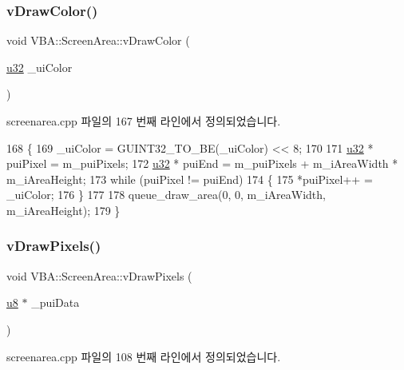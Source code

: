 \subsubsection{\texorpdfstring{v\+Draw\+Color()}{vDrawColor()}}
{\footnotesize\ttfamily void V\+B\+A\+::\+Screen\+Area\+::v\+Draw\+Color (\begin{DoxyParamCaption}\item[{\mbox{\hyperlink{_system_8h_a10e94b422ef0c20dcdec20d31a1f5049}{u32}}}]{\+\_\+ui\+Color }\end{DoxyParamCaption})}



screenarea.\+cpp 파일의 167 번째 라인에서 정의되었습니다.


\begin{DoxyCode}
168 \{
169   \_uiColor = GUINT32\_TO\_BE(\_uiColor) << 8;
170 
171   \mbox{\hyperlink{_system_8h_a10e94b422ef0c20dcdec20d31a1f5049}{u32}} * puiPixel = m\_puiPixels;
172   \mbox{\hyperlink{_system_8h_a10e94b422ef0c20dcdec20d31a1f5049}{u32}} * puiEnd   = m\_puiPixels + m\_iAreaWidth * m\_iAreaHeight;
173   \textcolor{keywordflow}{while} (puiPixel != puiEnd)
174   \{
175     *puiPixel++ = \_uiColor;
176   \}
177 
178   queue\_draw\_area(0, 0, m\_iAreaWidth, m\_iAreaHeight);
179 \}
\end{DoxyCode}
\mbox{\label{class_v_b_a_1_1_screen_area_ad7b6579afb665abf3b6a5004f03b63f8}} 
\subsubsection{\texorpdfstring{v\+Draw\+Pixels()}{vDrawPixels()}}
{\footnotesize\ttfamily void V\+B\+A\+::\+Screen\+Area\+::v\+Draw\+Pixels (\begin{DoxyParamCaption}\item[{\mbox{\hyperlink{_system_8h_aed742c436da53c1080638ce6ef7d13de}{u8}} $\ast$}]{\+\_\+pui\+Data }\end{DoxyParamCaption})}



screenarea.\+cpp 파일의 108 번째 라인에서 정의되었습니다.


